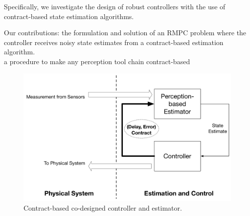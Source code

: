 Specifically, we investigate the design of robust controllers with the use of contract-based state estimation algorithms.

Our contributions: 
the formulation and solution of an RMPC problem where the controller receives noisy state estimates from a contract-based estimation algorithm.
\\
a procedure to make any perception tool chain contract-based 


\begin{figure}[t]
	\centering
		\includegraphics[scale=0.2]{figures/omnigraffle_figures/high_level_figure.pdf}		
		\caption{Contract-based co-designed controller and estimator.}
		\label{fig:codesignedCE}
\end{figure}

